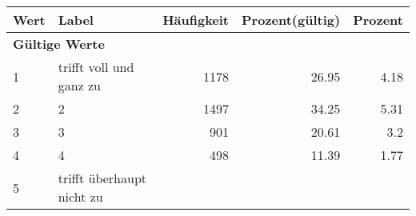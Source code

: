      \begin{longtable}{lXrrr}
     \toprule
     \textbf{Wert} & \textbf{Label} & \textbf{Häufigkeit} & \textbf{Prozent(gültig)} & \textbf{Prozent} \\
     \endhead
     \midrule
     \multicolumn{5}{l}{\textbf{Gültige Werte}}\\

     1 &
     \multicolumn{1}{X}{ trifft voll und ganz zu   } &


       \num{1178} &
       \num[round-mode=places,round-precision=2]{26.95} &
         \num[round-mode=places,round-precision=2]{4.18} \\

     2 &
     \multicolumn{1}{X}{ 2   } &


       \num{1497} &
       \num[round-mode=places,round-precision=2]{34.25} &
         \num[round-mode=places,round-precision=2]{5.31} \\

     3 &
     \multicolumn{1}{X}{ 3   } &


       \num{901} &
       \num[round-mode=places,round-precision=2]{20.61} &
         \num[round-mode=places,round-precision=2]{3.2} \\

     4 &
     \multicolumn{1}{X}{ 4   } &


       \num{498} &
       \num[round-mode=places,round-precision=2]{11.39} &
         \num[round-mode=places,round-precision=2]{1.77} \\

     5 &
     \multicolumn{1}{X}{ trifft überhaupt nicht zu   } &



\end{longtable}
